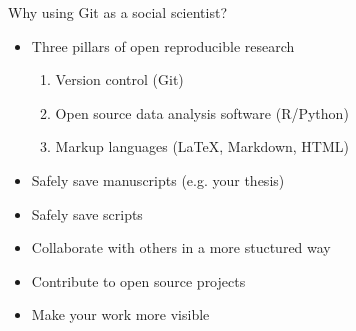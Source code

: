 \documentclass[handout]{beamer}
\begin{document}
\begin{frame}{Why using Git as a social scientist?}
\begin{itemize}
  \item Three pillars of open reproducible research
  \begin{enumerate}
    \item Version control (Git)
    \item Open source data analysis software (R/Python)
    \item Markup languages (LaTeX, Markdown, HTML)
  \end{enumerate}
	\item Safely save manuscripts (e.g. your thesis) 
	\item Safely save scripts
	\item Collaborate with others in a more stuctured way
	\item Contribute to open source projects
	\item Make your work more visible
\end{itemize}
\end{frame}
\end{document}

